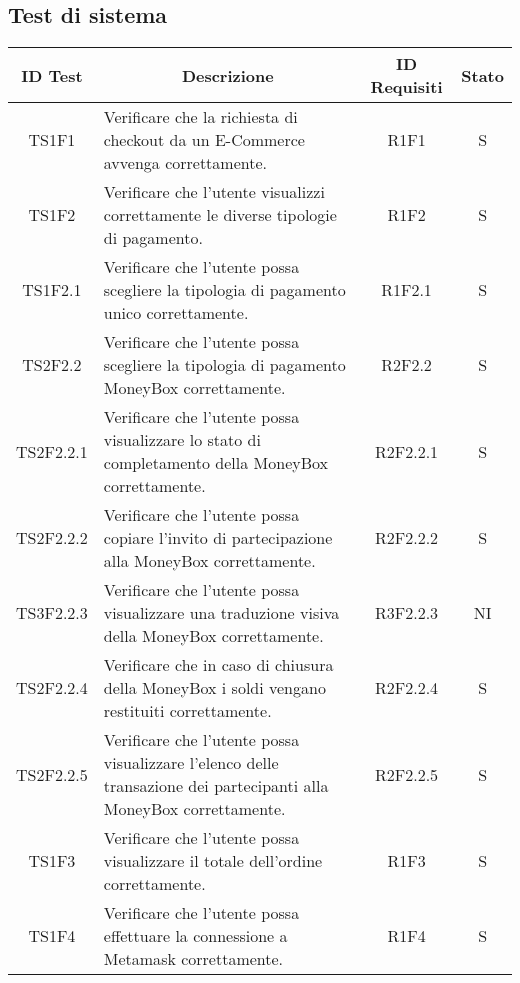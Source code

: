 \subsection{Test di sistema}\label{subsection:test_sistema}
\begin{table}[H]
  \centering
  \renewcommand{\arraystretch}{1.8}
  \begin{tabular}{c|p{8cm}|c|c}
    \rowcolor[HTML]{125E28}
    \color[HTML]{FFFFFF}\textbf{ID Test}
              & \multicolumn{1}{c}{\color[HTML]{FFFFFF}\textbf{Descrizione}}
              & \color[HTML]{FFFFFF}\textbf{ID Requisiti}
              & \color[HTML]{FFFFFF}\textbf{Stato}                                                                                                        \\
    \hline
    TS1F1     & Verificare che la richiesta di checkout da un E-Commerce\glo{} avvenga correttamente.                                     & R1F1     & S  \\
    TS1F2     & Verificare che l'utente visualizzi correttamente le diverse tipologie di pagamento.                                       & R1F2     & S  \\
    TS1F2.1   & Verificare che l'utente possa scegliere la tipologia di pagamento unico correttamente.                                    & R1F2.1   & S  \\
    TS2F2.2   & Verificare che l'utente possa scegliere la tipologia di pagamento MoneyBox\glo{} correttamente.                           & R2F2.2   & S  \\
    TS2F2.2.1 & Verificare che l'utente possa visualizzare lo stato di completamento della MoneyBox\glo{} correttamente.                  & R2F2.2.1 & S  \\
    TS2F2.2.2 & Verificare che l'utente possa copiare l'invito di partecipazione alla MoneyBox\glo{} correttamente.                       & R2F2.2.2 & S  \\
    TS3F2.2.3 & Verificare che l'utente possa visualizzare una traduzione visiva della MoneyBox\glo{} correttamente.                      & R3F2.2.3 & NI \\
    TS2F2.2.4 & Verificare che in caso di chiusura della MoneyBox\glo{} i soldi vengano restituiti correttamente.                         & R2F2.2.4 & S  \\
    TS2F2.2.5 & Verificare che l'utente possa visualizzare l'elenco delle transazione dei partecipanti alla MoneyBox\glo{} correttamente. & R2F2.2.5 & S  \\
    TS1F3     & Verificare che l'utente possa visualizzare il totale dell'ordine correttamente.                                           & R1F3     & S  \\
    TS1F4     & Verificare che l'utente possa effettuare la connessione a Metamask\glo{} correttamente.                                   & R1F4     & S  \\
  \end{tabular}
\end{table}
